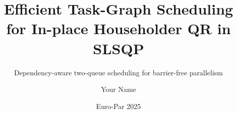 \documentclass[aspectratio=169]{beamer}
\title[Parallel In-place QR for SLSQP]{Efficient Task-Graph Scheduling for In-place Householder QR in SLSQP}
\subtitle{Dependency-aware two-queue scheduling for barrier-free parallelism}
\author{Your Name}
\institute{Your Lab / Department, Your Institute}
\date{Euro-Par 2025}
\begin{document}
\begin{frame}
  \titlepage
\end{frame}


















\end{document}
